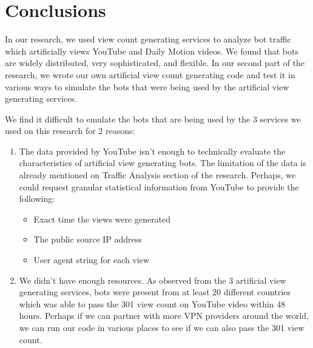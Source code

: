 \documentclass[conference]{IEEEtran}
\begin{document}
\section{Conclusions}

In our research, we used view count generating services to analyze bot traffic which artificially views YouTube and Daily Motion videos. We found that bots are widely distributed, very sophisticated, and flexible. In our second part of the research, we wrote our own artificial view count generating code and test it in various ways to simulate the bots that were being used by the artificial view generating services.

We find it difficult to emulate the bots that are being used by the 3 services we used on this research for 2 reasons:

\begin{enumerate}
  \item The data provided by YouTube isn't enough to technically evaluate the characteristics of artificial view generating bots. The limitation of the data is already mentioned on Traffic Analysis section of the research. Perhaps, we could request granular statistical information from YouTube to provide the following:
  \begin{itemize}
    \item Exact time the views were generated
    \item The public source IP address
    \item User agent string for each view
  \end{itemize}
  \item We didn't have enough resources. As observed from the 3 artificial view generating services, bots were present from at least 20 different countries which was able to pass the 301 view count on YouTube video within 48 hours. Perhaps if we can partner with more VPN providers around the world, we can run our code in various places to see if we can also pass the 301 view count.
\end{enumerate}




\end{document}

